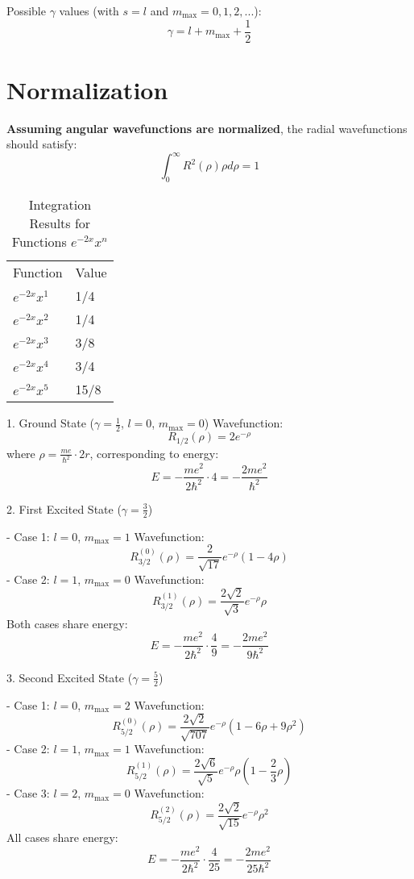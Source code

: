 \documentclass[12pt]{article}
\begin{document}
Possible $\gamma$ values (with $s=l$ and $m_{\text{max}} = 0,1,2,...$):
$$\gamma = l + m_{\text{max}} + \frac{1}{2}$$

\section{Normalization}
\textbf{Assuming angular wavefunctions are normalized}, the radial wavefunctions should satisfy:
$$\int_0^\infty R^2(\rho)\rho d\rho = 1$$

\begin{table}[H]
    \centering
    \caption{Integration Results for Functions $e^{-2x}x^n$}
    \begin{tabular}{|l|l|}
    \hline
    Function & Value \\
    
    $e^{-2x}x^1$ & 1/4 \\
    $e^{-2x}x^2$ & 1/4 \\
    $e^{-2x}x^3$ & 3/8 \\
    $e^{-2x}x^4$ & 3/4 \\
    $e^{-2x}x^5$ & 15/8 \\
    \hline
    \end{tabular}
\end{table}

1. Ground State ($\gamma = \frac{1}{2}$, $l = 0$, $m_{\text{max}} = 0$)
Wavefunction:
$$R_{1/2}(\rho) = 2e^{-\rho}$$
where $\rho = \frac{me}{\hbar^2} \cdot 2r$, corresponding to energy:
$$E = -\frac{me^2}{2\hbar^2} \cdot 4 = -\frac{2me^2}{\hbar^2}$$

2. First Excited State ($\gamma = \frac{3}{2}$)

- Case 1: $l=0$, $m_{\text{max}}=1$
Wavefunction:
$$R_{3/2}^{(0)}(\rho) = \frac{2}{\sqrt{17}}e^{-\rho}(1 - 4\rho)$$
- Case 2: $l=1$, $m_{\text{max}}=0$
Wavefunction:
$$R_{3/2}^{(1)}(\rho) = \frac{2\sqrt{2}}{\sqrt{3}}e^{-\rho}\rho$$
Both cases share energy:
$$E = -\frac{me^2}{2\hbar^2} \cdot \frac{4}{9} = -\frac{2me^2}{9\hbar^2}$$

3. Second Excited State ($\gamma = \frac{5}{2}$)

- Case 1: $l=0$, $m_{\text{max}}=2$
Wavefunction:
$$R_{5/2}^{(0)}(\rho) = \frac{2\sqrt{2}}{\sqrt{707}}e^{-\rho}(1 - 6\rho + 9\rho^2)$$
- Case 2: $l=1$, $m_{\text{max}}=1$
Wavefunction:
$$R_{5/2}^{(1)}(\rho) = \frac{2\sqrt{6}}{\sqrt{5}}e^{-\rho}\rho\left(1 - \frac{2}{3}\rho\right)$$
- Case 3: $l=2$, $m_{\text{max}}=0$
Wavefunction:
$$R_{5/2}^{(2)}(\rho) = \frac{2\sqrt{2}}{\sqrt{15}}e^{-\rho}\rho^2$$
All cases share energy:
$$E = -\frac{me^2}{2\hbar^2} \cdot \frac{4}{25} = -\frac{2me^2}{25\hbar^2}$$
\end{document}
